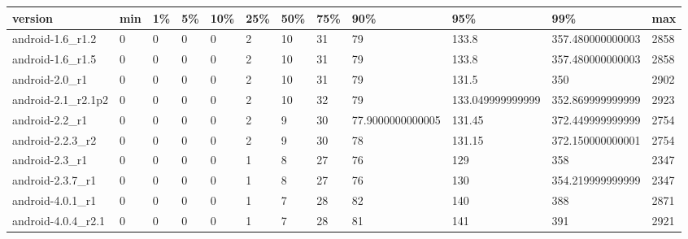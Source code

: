 \documentclass[a4paper]{article}
\begin{document}
\begin{tabular}{|l|l|l|l|l|l|l|l|l|l|l|l|}
\hline
version&min&1\%&5\%&10\%&25\%&50\%&75\%&90\%&95\%&99\%&max\\
\hline
android-1.6\_r1.2&0&0&0&0&2&10&31&79&133.8&357.480000000003&2858\\
\hline
android-1.6\_r1.5&0&0&0&0&2&10&31&79&133.8&357.480000000003&2858\\
\hline
android-2.0\_r1&0&0&0&0&2&10&31&79&131.5&350&2902\\
\hline
android-2.1\_r2.1p2&0&0&0&0&2&10&32&79&133.049999999999&352.869999999999&2923\\
\hline
android-2.2\_r1&0&0&0&0&2&9&30&77.9000000000005&131.45&372.449999999999&2754\\
\hline
android-2.2.3\_r2&0&0&0&0&2&9&30&78&131.15&372.150000000001&2754\\
\hline
android-2.3\_r1&0&0&0&0&1&8&27&76&129&358&2347\\
\hline
android-2.3.7\_r1&0&0&0&0&1&8&27&76&130&354.219999999999&2347\\
\hline
android-4.0.1\_r1&0&0&0&0&1&7&28&82&140&388&2871\\
\hline
android-4.0.4\_r2.1&0&0&0&0&1&7&28&81&141&391&2921\\
\hline
\end{tabular}
\end{document}
